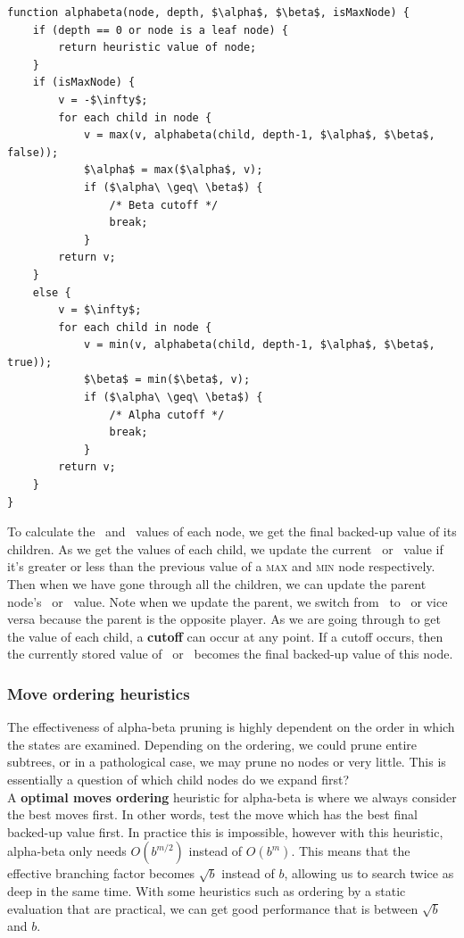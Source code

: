 \documentclass{article}
\newcommand{\n}[0]{\\[\baselineskip]}
\begin{document}
\begin{lstlisting}[caption={Alpha-Beta Algorithm}, label=algo:alpha-beta, mathescape=true]
function alphabeta(node, depth, $\alpha$, $\beta$, isMaxNode) {
	if (depth == 0 or node is a leaf node) {
		return heuristic value of node;
	}
	if (isMaxNode) {
		v = -$\infty$;
		for each child in node {
			v = max(v, alphabeta(child, depth-1, $\alpha$, $\beta$, false));
			$\alpha$ = max($\alpha$, v);
			if ($\alpha\ \geq\ \beta$) {
				/* Beta cutoff */
				break;
			}
		return v;
	}
	else {
		v = $\infty$;
		for each child in node {
			v = min(v, alphabeta(child, depth-1, $\alpha$, $\beta$, true));
			$\beta$ = min($\beta$, v);
			if ($\alpha\ \geq\ \beta$) {
				/* Alpha cutoff */
				break;
			}
		return v;
	}
}
\end{lstlisting}
To calculate the \alpha\ and \beta\ values of each node, we get the final backed-up value of its children. As we get the values of each child, we update the current \alpha\ or \beta\ value if it's greater or less than the previous value of a \textsc{max} and \textsc{min} node respectively. Then when we have gone through all the children, we can update the parent node's \alpha\ or \beta\ value. Note when we update the parent, we switch from \alpha\ to \beta\ or vice versa because the parent is the opposite player. As we are going through to get the value of each child, a \textbf{cutoff} can occur at any point. If a cutoff occurs, then the currently stored value of \alpha\ or \beta\ becomes the final backed-up value of this node. 
\subsubsection{Move ordering heuristics}
The effectiveness of alpha-beta pruning is highly dependent on the order in which the states are examined. Depending on the ordering, we could prune entire subtrees, or in a pathological case, we may prune no nodes or very little. This is essentially a question of which child nodes do we expand first?
\n
A \textbf{optimal moves ordering} heuristic for alpha-beta is where we always consider the best moves first. In other words, test the move which has the best final backed-up value first. In practice this is impossible, however with this heuristic, alpha-beta only needs $O(b^{m/2})$ instead of $O(b^m)$. This means that the effective branching factor becomes $\sqrt{b}$ instead of $b$, allowing us to search twice as deep in the same time. With some heuristics such as ordering by a static evaluation that are practical, we can get good performance that is between $\sqrt{b}$ and $b$. 
\end{document}
